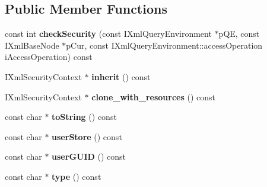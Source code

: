 \subsection*{\-Public \-Member \-Functions}
\begin{DoxyCompactItemize}
\item 
\hypertarget{classgeneral__server_1_1DatabaseNodeUserStoreSecurityContext_a84b8f9385bd4f26438036cca15128275}{const int {\bfseries check\-Security} (const \-I\-Xml\-Query\-Environment $\ast$p\-Q\-E, const \-I\-Xml\-Base\-Node $\ast$p\-Cur, const \-I\-Xml\-Query\-Environment\-::access\-Operation i\-Access\-Operation) const }\label{classgeneral__server_1_1DatabaseNodeUserStoreSecurityContext_a84b8f9385bd4f26438036cca15128275}

\item 
\hypertarget{classgeneral__server_1_1DatabaseNodeUserStoreSecurityContext_adc729fc405e7e3c447296d368e6c34b4}{\-I\-Xml\-Security\-Context $\ast$ {\bfseries inherit} () const }\label{classgeneral__server_1_1DatabaseNodeUserStoreSecurityContext_adc729fc405e7e3c447296d368e6c34b4}

\item 
\hypertarget{classgeneral__server_1_1DatabaseNodeUserStoreSecurityContext_a8dd0f9353f0ca707fa5d4342bbdd4526}{\-I\-Xml\-Security\-Context $\ast$ {\bfseries clone\-\_\-with\-\_\-resources} () const }\label{classgeneral__server_1_1DatabaseNodeUserStoreSecurityContext_a8dd0f9353f0ca707fa5d4342bbdd4526}

\item 
\hypertarget{classgeneral__server_1_1DatabaseNodeUserStoreSecurityContext_ac36c5cb6dd1b2c46a42140a1be6a9406}{const char $\ast$ {\bfseries to\-String} () const }\label{classgeneral__server_1_1DatabaseNodeUserStoreSecurityContext_ac36c5cb6dd1b2c46a42140a1be6a9406}

\item 
\hypertarget{classgeneral__server_1_1DatabaseNodeUserStoreSecurityContext_a7042bcffa3a83860115887aaf8d93ce9}{const char $\ast$ {\bfseries user\-Store} () const }\label{classgeneral__server_1_1DatabaseNodeUserStoreSecurityContext_a7042bcffa3a83860115887aaf8d93ce9}

\item 
\hypertarget{classgeneral__server_1_1DatabaseNodeUserStoreSecurityContext_a3607d86e6ce7e3211138d5b40f71f5b5}{const char $\ast$ {\bfseries user\-G\-U\-I\-D} () const }\label{classgeneral__server_1_1DatabaseNodeUserStoreSecurityContext_a3607d86e6ce7e3211138d5b40f71f5b5}

\item 
\hypertarget{classgeneral__server_1_1DatabaseNodeUserStoreSecurityContext_ad244936c3e2daa8b90c4d69e9d0e01b2}{const char $\ast$ {\bfseries type} () const }\label{classgeneral__server_1_1DatabaseNodeUserStoreSecurityContext_ad244936c3e2daa8b90c4d69e9d0e01b2}


\end{DoxyCompactItemize}
